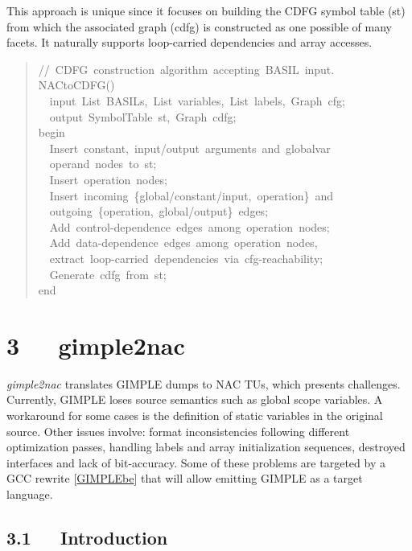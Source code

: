 \documentclass[a4paper]{article}
\begin{document}
This approach is unique since it focuses on building the CDFG symbol table (st)
from which the associated graph (cdfg) is constructed as one possible of many facets.
It naturally supports loop-carried dependencies and array accesses.
%
\begin{quote}{\ttfamily \raggedright \noindent
//~CDFG~construction~algorithm~accepting~BASIL~input.\\
NACtoCDFG()\\
~~input~List~BASILs,~List~variables,~List~labels,~Graph~cfg;\\
~~output~SymbolTable~st,~Graph~cdfg;\\
begin\\
~~Insert~constant,~input/output~arguments~and~globalvar\\
~~operand~nodes~to~st;\\
~~Insert~operation~nodes;\\
~~Insert~incoming~\{global/constant/input,~operation\}~and\\
~~outgoing~\{operation,~global/output\}~edges;\\
~~Add~control-dependence~edges~among~operation~nodes;\\
~~Add~data-dependence~edges~among~operation~nodes,\\
~~extract~loop-carried~dependencies~via~cfg-reachability;\\
~~Generate~cdfg~from~st;\\
end
}
\end{quote}


\section{3~~~gimple2nac%
  \label{gimple2nac}%
}

\emph{gimple2nac} translates GIMPLE dumps to NAC TUs, which presents challenges.
Currently, GIMPLE loses source semantics such as global scope variables.
A workaround for some cases is the definition of static variables in the
original source. Other issues involve: format inconsistencies following
different optimization passes, handling labels and array initialization
sequences, destroyed interfaces and lack of bit-accuracy. Some of these
problems are targeted by a GCC rewrite {[}\href{http://gcc.gnu.org/wiki/gimplebackend}{GIMPLEbe}{]} that will allow emitting
GIMPLE as a target language.


\subsection{3.1~~~Introduction%
  \label{id1}%
}
\end{document}
